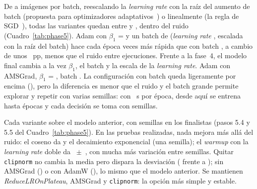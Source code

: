 {De  a  imágenes por batch, reescalando la \emph{learning rate} con la raíz del
aumento de batch (propuesta para optimizadores adaptativos~\cite{malladi}) o linealmente (la regla de SGD~\cite{goyal}),
todas las variantes quedan entre  y , dentro del ruido
(Cuadro~\ref{tab:phase5}).}
{Adam con $\beta_1$ =  y un batch de  (\emph{learning rate} ,
escalada con la raíz del batch) hace cada época  veces más rápida que con batch
, a cambio de unos ~pp, menos que el ruido entre ejecuciones. Frente a la fase~4, el modelo
final cambia a la vez $\beta_1$, el batch y la escala de la \emph{learning rate}.}
{Adam con AMSGrad, $\beta_1$ = , batch . La configuración con batch
 queda ligeramente por encima (), pero la diferencia es menor que el ruido y
el batch grande permite explorar y repetir con varias semillas: con ~s por época, desde aquí se
entrena hasta  épocas y cada decisión se toma con  semillas.}

{Cada variante sobre el modelo anterior, con  semillas en los finalistas (pasos 5.4 y 5.5 del
Cuadro~\ref{tab:phase5}).}
{En las pruebas realizadas, nada mejora más allá del ruido: el coseno da  y el decaimiento
exponencial  (una semilla); el \emph{warmup} con la \emph{learning rate} doble da
~$\pm$~, con mucha más variación entre semillas.
Quitar \texttt{clipnorm} no cambia la media pero dispara la desviación ( frente a
); sin AMSGrad () o con AdamW (), lo
mismo que el modelo anterior.}
{Se mantienen \emph{ReduceLROnPlateau}, AMSGrad y \texttt{clipnorm}: la opción más simple y estable.}

\begin{table}[!htbp]
  \centering\small
  \caption{Variantes de la fase 5 (validación; media $\pm$ desviación típica cuando hay varias semillas). Pasos 5.1 a
  5.3: hasta  épocas, y batch  salvo en 5.3; pasos 5.4 y 5.5: cambios
  sobre el modelo final, hasta  épocas.}
  \label{tab:phase5}
\end{table}
